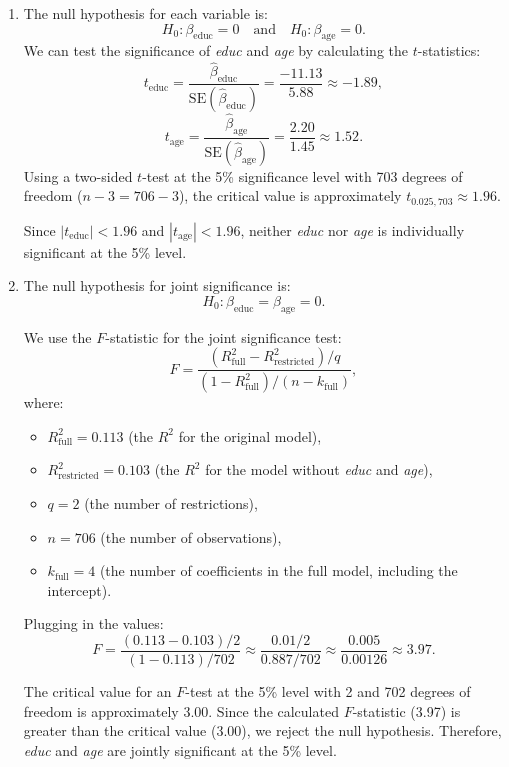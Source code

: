 \documentclass[12pt]{article}
\begin{document}
\begin{enumerate}
{\begin{enumerate}
    \item The null hypothesis for each variable is:
    \[
    H_0: \beta_{\text{educ}} = 0 \quad \text{and} \quad H_0: \beta_{\text{age}} = 0.
    \]
    We can test the significance of \textit{educ} and \textit{age} by calculating the $t$-statistics:
    \[
    t_{\text{educ}} = \frac{\hat{\beta}_{\text{educ}}}{\text{SE}(\hat{\beta}_{\text{educ}})} = \frac{-11.13}{5.88} \approx -1.89,
    \]
    \[
    t_{\text{age}} = \frac{\hat{\beta}_{\text{age}}}{\text{SE}(\hat{\beta}_{\text{age}})} = \frac{2.20}{1.45} \approx 1.52.
    \]
    Using a two-sided $t$-test at the 5\% significance level with 703 degrees of freedom ($n - 3 = 706 - 3$), the critical value is approximately $t_{0.025, 703} \approx 1.96$. 

    Since $|t_{\text{educ}}| < 1.96$ and $|t_{\text{age}}| < 1.96$, neither \textit{educ} nor \textit{age} is individually significant at the 5\% level.

    \item  The null hypothesis for joint significance is:
    \[
    H_0: \beta_{\text{educ}} = \beta_{\text{age}} = 0.
    \]

    We use the $F$-statistic for the joint significance test:
    \[
    F = \frac{(R^2_{\text{full}} - R^2_{\text{restricted}}) / q}{(1 - R^2_{\text{full}}) / (n - k_{\text{full}})},
    \]
    where:
    \begin{itemize}
        \item $R^2_{\text{full}} = 0.113$ (the $R^2$ for the original model),
        \item $R^2_{\text{restricted}} = 0.103$ (the $R^2$ for the model without \textit{educ} and \textit{age}),
        \item $q = 2$ (the number of restrictions),
        \item $n = 706$ (the number of observations),
        \item $k_{\text{full}} = 4$ (the number of coefficients in the full model, including the intercept).
    \end{itemize}

    Plugging in the values:
    \[
    F = \frac{(0.113 - 0.103) / 2}{(1 - 0.113) / 702} \approx \frac{0.01 / 2}{0.887 / 702} \approx \frac{0.005}{0.00126} \approx 3.97.
    \]

    The critical value for an $F$-test at the 5\% level with 2 and 702 degrees of freedom is approximately 3.00. Since the calculated $F$-statistic (3.97) is greater than the critical value (3.00), we reject the null hypothesis. Therefore, \textit{educ} and \textit{age} are jointly significant at the 5\% level.


\end{enumerate}}
\end{enumerate}
\end{document}
